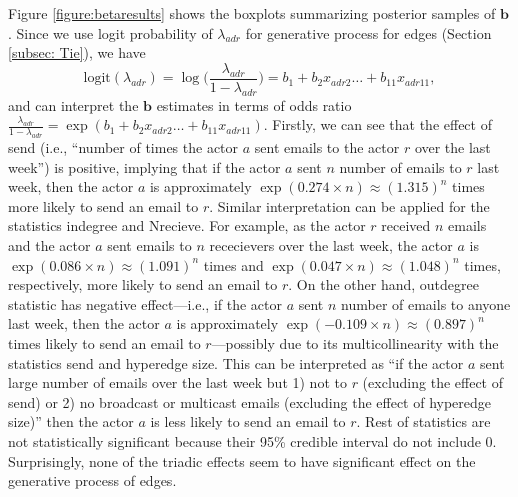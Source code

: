 \documentclass[ba]{imsart}
\numberwithin{equation}{section}
\theoremstyle{plain}
\begin{document}
	Figure \ref{figure:betaresults} shows the boxplots summarizing posterior samples of $\boldsymbol{b}$. Since we use logit probability of $\lambda_{adr}$ for generative process for edges (Section \ref{subsec: Tie}), we have
	\begin{equation*}
	\mbox{logit}(\lambda_{adr})=\log\Big(\frac{\lambda_{adr}}{1-\lambda_{adr}}\Big) =b_{1}+b_{2} x_{adr2}\ldots+b_{11}x_{adr11},
	\end{equation*}
	and can interpret the $\boldsymbol{b}$ estimates in terms of odds ratio $\frac{\lambda_{adr}}{1-\lambda_{adr}}=\exp(b_{1}+b_{2} x_{adr2}\ldots+b_{11}x_{adr11})$.
	Firstly, we can see that the effect of send (i.e., ``number of times the actor $a$ sent emails to the actor $r$ over the last week'') is positive, implying that if the actor $a$ sent $n$ number of emails to $r$ last week, then the actor $a$ is approximately $\exp(0.274\times n)\approx(1.315)^n$ times more likely to send an email to $r$. Similar interpretation can be applied for the statistics indegree and Nrecieve. For example, as the actor $r$ received $n$ emails and the actor $a$ sent emails to $n$ rececievers over the last week, the actor $a$ is $\exp(0.086\times n)\approx(1.091)^n $ times and $\exp(0.047\times n)\approx(1.048)^n$ times, respectively, more likely to send an email to $r$. On the other hand, outdegree statistic has negative effect---i.e., if the actor $a$ sent $n$ number of emails to anyone last week, then the actor $a$ is approximately $\exp(-0.109\times n)\approx(0.897)^n$ times likely to send an email to $r$---possibly due to its multicollinearity with the statistics send and hyperedge size. This can be interpreted as ``if the actor $a$ sent large number of emails over the last week but 1) not to $r$ (excluding the effect of send) or 2) no broadcast or multicast emails (excluding the effect of hyperedge size)'' then the actor $a$ is less likely to send an email to $r$. Rest of statistics are not statistically significant because their 95\% credible interval do not include 0. Surprisingly, none of the triadic effects seem to have significant effect on the generative process of edges.
	
\end{document}
